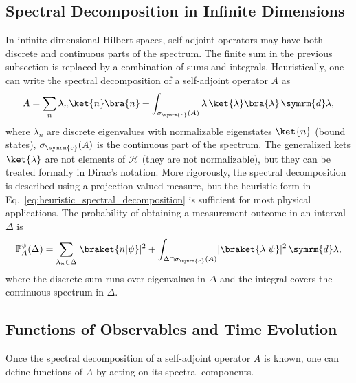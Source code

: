 \subsection{Spectral Decomposition in Infinite Dimensions}\label{sec:spectral_decompositions_in_infinite_dimensions}
In infinite-dimensional Hilbert spaces, self-adjoint operators may have both discrete and continuous parts of the spectrum. The finite sum in the previous subsection is replaced by a combination of sums and integrals. Heuristically, one can write the spectral decomposition of a self-adjoint operator $A$ as\cite{1021172445}
\begin{equation}\label{eq:heuristic_spectral_decomposition}
A=\sum_n\lambda_n\ket{n}\bra{n}+\int_{\sigma_{\symrm{c}}(A)} \lambda\,\ket{\lambda}\bra{\lambda}\,\symrm{d}\lambda,
\end{equation}
where $\lambda_n$ are discrete eigenvalues with normalizable eigenstates $\ket{n}$ (bound states), $\sigma_{\symrm{c}}(A)$ is the continuous part of the spectrum. The generalized kets $\ket{\lambda}$ are not elements of $\mathcal{H}$ (they are not normalizable), but they can be treated formally in Dirac’s notation. More rigorously, the spectral decomposition is described using a projection-valued measure, but the heuristic form in Eq.~\eqref{eq:heuristic_spectral_decomposition} is sufficient for most physical applications. The probability of obtaining a measurement outcome in an interval $\Delta$ is
\begin{equation}
\mathbb P_A^\psi(\Delta)=\sum_{\lambda_n\in\Delta}\lvert\braket{n\vert\psi}\rvert^2+\int_{\Delta\cap\sigma_{\symrm{c}}(A)}\lvert\braket{\lambda\vert\psi}\rvert^2\,\symrm{d}\lambda,
\end{equation}
where the discrete sum runs over eigenvalues in $\Delta$ and the integral covers the continuous spectrum in $\Delta$.
\subsection{Functions of Observables and Time Evolution}\label{sec:functions_of_observables_and_time_evolution}
Once the spectral decomposition of a self-adjoint operator $A$ is known, one can define functions of $A$ by acting on its spectral components.

